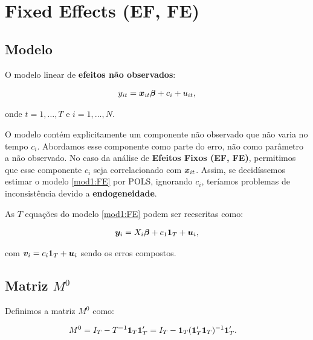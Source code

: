 \documentclass[11pt,oneside,a4paper]{article}
\numberwithin{equation}{section}
\begin{document}
\clearpage
\section{Fixed Effects (EF, FE)}


\subsection*{Modelo}

O modelo linear de \textbf{efeitos não observados}:

\vspace{-1 em}
\begin{align} \label{mod1:FE}
	y_{it} = \boldsymbol{x}_{it} \boldsymbol{\beta} + c_{i} + u_{it},
\end{align}

\noindent
onde
$t = 1, \dots, T$ e $i = 1, \dots, N$.

O modelo contém explicitamente um componente não observado que não varia no tempo $c_{i}$.
Abordamos esse componente como parte do erro, não como parâmetro a não observado.
No caso da análise de \textbf{Efeitos Fixos (EF, FE)}, permitimos que esse componente $c_{i}$ seja correlacionado com $\boldsymbol{x}_{it}$.
Assim, se decidíssemos estimar o modelo \eqref{mod1:FE} por POLS, ignorando $c_{i}$, teríamos problemas de inconsistência devido a \textbf{endogeneidade}.

As $T$ equações do modelo \eqref{mod1:FE} podem ser reescritas como:

\vspace{-1 em}
\begin{align} \label{mod2:FE}
	\boldsymbol{y}_{i} = X_{i} \boldsymbol{\beta} + c_{1} \boldsymbol{1}_{T} + \boldsymbol{u}_{i},
\end{align}

\noindent
com
$\boldsymbol{v}_{i} = c_{i} \boldsymbol{1}_{T} + \boldsymbol{u}_{i}$ sendo os erros compostos.

\subsection*{Matriz $M^{0}$}

Definimos a matriz $M^{0}$ como:

\vspace{-1 em}
\begin{align*}
	M^{0} &=
	I_{T} - T^{-1} \boldsymbol{1}_{T} \boldsymbol{1}_{T}'
	=
	I_{T} - \boldsymbol{1}_{T} (\boldsymbol{1}_{T}' \boldsymbol{1}_{T})^{-1} \boldsymbol{1}_{T}'.
\end{align*}
\end{document}
